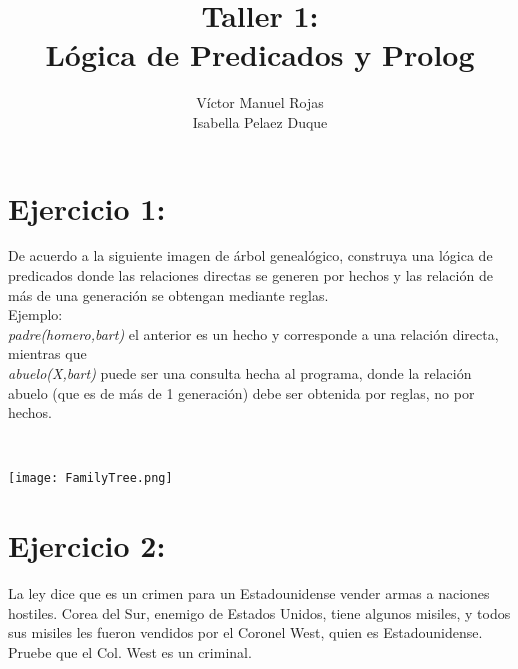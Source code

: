 \documentclass[12pt]{article}
\title{\textbf{Taller 1:} \\[0.3cm] Lógica de Predicados y Prolog}
\author{Víctor Manuel Rojas \\ Isabella Pelaez Duque}
\date{}
\begin{document}
\maketitle

\section*{Ejercicio 1:}
De acuerdo a la siguiente imagen de árbol genealógico, construya una lógica de predicados donde las relaciones directas se generen por hechos y las relación de más de una generación se obtengan mediante reglas. \\[0.3cm]
Ejemplo: \\ 
\textit{padre(homero,bart)} el anterior es un hecho y corresponde a una relación directa, mientras que \\ 
\textit{abuelo(X,bart)} puede ser una consulta hecha al programa, donde la relación abuelo (que es de más de 1 generación) debe ser obtenida por reglas, no por hechos.

\\[0.5cm]
\begin{center}
    \texttt{[image: FamilyTree.png]}
\end{center}

\section*{Ejercicio 2:}
La ley dice que es un crimen para un Estadounidense vender armas a naciones hostiles. Corea del Sur, enemigo de Estados Unidos, tiene algunos misiles, y todos sus misiles les fueron vendidos por el Coronel West, quien es Estadounidense. \\[0.3cm]
Pruebe que el Col. West es un criminal.
\end{document}

